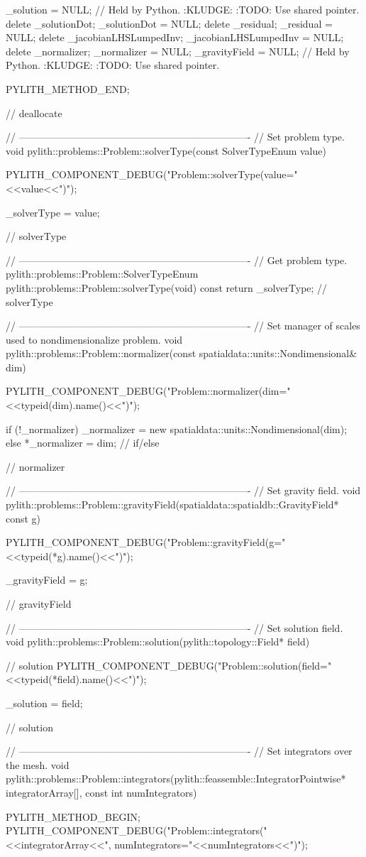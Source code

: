\begin{cplusplus}
{    _solution = NULL; // Held by Python. :KLUDGE: :TODO: Use shared pointer.
    delete _solutionDot; _solutionDot = NULL;
    delete _residual; _residual = NULL;
    delete _jacobianLHSLumpedInv; _jacobianLHSLumpedInv = NULL;
    delete _normalizer; _normalizer = NULL;
    _gravityField = NULL; // Held by Python. :KLUDGE: :TODO: Use shared pointer.

    PYLITH_METHOD_END;
} // deallocate

// ----------------------------------------------------------------------
// Set problem type.
void
pylith::problems::Problem::solverType(const SolverTypeEnum value) {
    PYLITH_COMPONENT_DEBUG("Problem::solverType(value="<<value<<")");

    _solverType = value;
} // solverType

// ----------------------------------------------------------------------
// Get problem type.
pylith::problems::Problem::SolverTypeEnum
pylith::problems::Problem::solverType(void) const {
    return _solverType;
} // solverType

// ----------------------------------------------------------------------
// Set manager of scales used to nondimensionalize problem.
void
pylith::problems::Problem::normalizer(const spatialdata::units::Nondimensional& dim) {
    PYLITH_COMPONENT_DEBUG("Problem::normalizer(dim="<<typeid(dim).name()<<")");

    if (!_normalizer) {
        _normalizer = new spatialdata::units::Nondimensional(dim);
    } else {
        *_normalizer = dim;
    } // if/else
} // normalizer

// ----------------------------------------------------------------------
// Set gravity field.
void
pylith::problems::Problem::gravityField(spatialdata::spatialdb::GravityField* const g) {
    PYLITH_COMPONENT_DEBUG("Problem::gravityField(g="<<typeid(*g).name()<<")");

    _gravityField = g;
} // gravityField

// ----------------------------------------------------------------------
// Set solution field.
void
pylith::problems::Problem::solution(pylith::topology::Field* field)
{ // solution
    PYLITH_COMPONENT_DEBUG("Problem::solution(field="<<typeid(*field).name()<<")");

    _solution = field;
} // solution

// ----------------------------------------------------------------------
// Set integrators over the mesh.
void
pylith::problems::Problem::integrators(pylith::feassemble::IntegratorPointwise* integratorArray[],
                                       const int numIntegrators) {
    PYLITH_METHOD_BEGIN;
    PYLITH_COMPONENT_DEBUG("Problem::integrators("<<integratorArray<<", numIntegrators="<<numIntegrators<<")");

}
\end{cplusplus}
